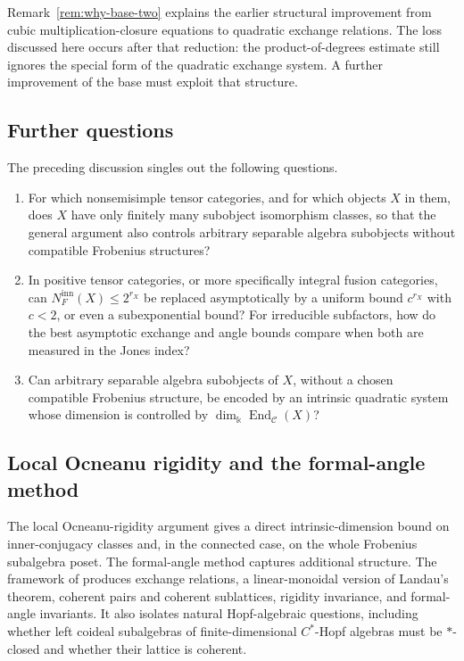 \documentclass[11pt]{amsart}
\theoremstyle{definition}
\theoremstyle{remark}
\newcommand{\C}{\mathcal C}
\newcommand{\kk}{\Bbbk}
\DeclareMathOperator{\End}{End}
\begin{document}
Remark~\ref{rem:why-base-two} explains the earlier structural improvement
from cubic multiplication-closure equations to quadratic exchange relations.
The loss discussed here occurs after that reduction: the product-of-degrees
estimate still ignores the special form of the quadratic exchange system.
A further improvement of the base must exploit that structure.

\subsection{Further questions}

The preceding discussion singles out the following questions.
\begin{enumerate}[label=\textup{\arabic*.}]
  \item For which nonsemisimple tensor categories, and for which objects $X$
  in them, does $X$ have only finitely many subobject isomorphism classes,
  so that the general argument also controls arbitrary separable algebra
  subobjects without compatible Frobenius structures?

  \item \label{q:optimal-bounds}
  In positive tensor categories, or more specifically integral fusion
  categories, can $N_F^{\mathrm{inn}}(X)\leq2^{r_X}$ be replaced
  asymptotically by a uniform bound $c^{r_X}$ with $c<2$, or even a
  subexponential bound?  For irreducible subfactors, how do the best
  asymptotic exchange and angle bounds compare when both are measured
  in the Jones index?

  \item Can arbitrary separable algebra subobjects of $X$, without a chosen
  compatible Frobenius structure, be encoded by an intrinsic quadratic
  system whose dimension is controlled by
  $\dim_{\kk}\End_{\C}(X)$?
\end{enumerate}

\subsection{Local Ocneanu rigidity and the formal-angle method}

The local Ocneanu-rigidity argument gives a direct intrinsic-dimension
bound on inner-conjugacy classes and, in the connected case, on the whole
Frobenius subalgebra poset.  The formal-angle method
captures additional structure.  The framework of
\cite{GhoshPalcouxExchange,GhoshPalcouxLattices} produces exchange relations,
a linear-monoidal version of Landau's theorem, coherent pairs and coherent
sublattices, rigidity invariance, and formal-angle invariants.  It also
isolates natural Hopf-algebraic questions, including whether left coideal
subalgebras of finite-dimensional $C^*$-Hopf algebras must be $*$-closed and
whether their lattice is coherent.
\end{document}
